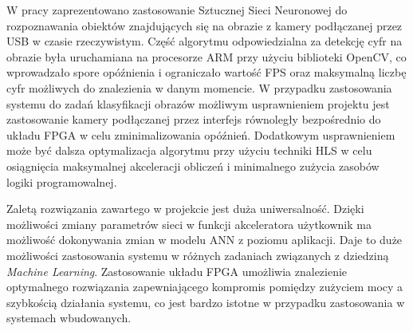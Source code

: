 W pracy zaprezentowano zastosowanie Sztucznej Sieci Neuronowej do rozpoznawania obiektów 
znajdujących się na obrazie z kamery podłączanej przez USB w czasie rzeczywistym. Część algorytmu 
odpowiedzialna za detekcję cyfr na obrazie była uruchamiana na procesorze ARM przy użyciu 
biblioteki OpenCV, co wprowadzało spore opóźnienia i ograniczało wartość FPS oraz maksymalną liczbę 
cyfr możliwych do znalezienia w danym momencie. W przypadku zastosowania systemu do zadań 
klasyfikacji obrazów możliwym usprawnieniem projektu jest zastosowanie kamery podłączanej przez 
interfejs równoległy bezpośrednio do układu FPGA w celu zminimalizowania opóźnień. Dodatkowym 
usprawnieniem może być dalsza optymalizacja algorytmu przy użyciu techniki HLS w celu osiągnięcia maksymalnej akceleracji obliczeń i minimalnego zużycia zasobów logiki programowalnej.

Zaletą rozwiązania zawartego w projekcie jest duża uniwersalność. Dzięki możliwości zmiany 
parametrów sieci w funkcji akceleratora użytkownik ma możliwość dokonywania zmian w modelu ANN z 
poziomu aplikacji. Daje to duże możliwości zastosowania systemu w różnych zadaniach związanych z 
dziedziną \emph{Machine Learning}. Zastosowanie układu FPGA umożliwia znalezienie optymalnego 
rozwiązania zapewniającego kompromis pomiędzy zużyciem mocy a szybkością działania systemu, co jest bardzo istotne w przypadku zastosowania w systemach wbudowanych.
